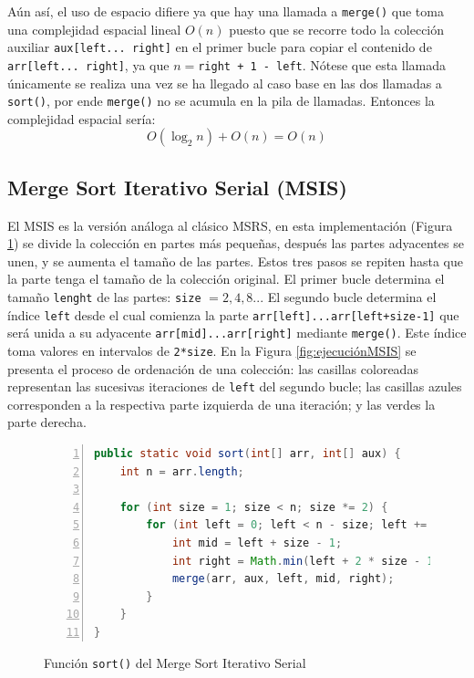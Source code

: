 \documentclass[titlepage]{article}
\begin{document}
Aún así, el uso de espacio difiere ya que hay una llamada a \lstinline|merge()| que toma una complejidad espacial lineal \(O(n)\) puesto que se recorre todo la colección auxiliar \lstinline|aux[left... right]| en el primer bucle para copiar el contenido de \lstinline|arr[left... right]|, ya que \(n=\)\lstinline|right + 1 - left|. Nótese que esta llamada únicamente se realiza una vez se ha llegado al caso base en las dos llamadas a \lstinline|sort()|, por ende \lstinline|merge()| no se acumula en la pila de llamadas. Entonces la complejidad espacial sería:
\[ O(\log_{2}n) + O(n) = O(n)\]

\subsection{Merge Sort Iterativo Serial (MSIS)}

El MSIS es la versión análoga al clásico MSRS, en esta implementación (Figura \ref{fig:MSIS_sort()}) se divide la colección en partes más pequeñas, después las partes adyacentes se unen, y se aumenta el tamaño  de las partes. Estos tres pasos se repiten hasta que la parte tenga el tamaño de la colección original. El primer bucle determina el tamaño \lstinline{lenght} de las partes: \lstinline{size} \(=2, 4, 8..\). El segundo bucle determina el índice \lstinline{left} desde el cual comienza la parte \lstinline{arr[left]...arr[left+size-1]} que será unida a su adyacente \lstinline{arr[mid]...arr[right]} mediante \lstinline{merge()}. Este índice toma valores en intervalos de \lstinline{2*size}. En la Figura \ref{fig:ejecuciónMSIS} se presenta el proceso de ordenación de una colección: las casillas coloreadas representan las sucesivas iteraciones de \lstinline{left} del segundo bucle; las casillas azules corresponden a la respectiva parte izquierda de una iteración; y las verdes la parte derecha.

\begin{figure}[hbtp]
    \begin{lstlisting}[language=java, frame=single, numbers=left]
public static void sort(int[] arr, int[] aux) {
	int n = arr.length;
	
	for (int size = 1; size < n; size *= 2) {
		for (int left = 0; left < n - size; left += 2 * size) {
			int mid = left + size - 1;
			int right = Math.min(left + 2 * size - 1, n - 1);
			merge(arr, aux, left, mid, right);
		}
	}
}
    \end{lstlisting}
    \caption{Función \lstinline{sort()} del Merge Sort Iterativo Serial}
    \label{fig:MSIS_sort()}
\end{figure}
\end{document}
